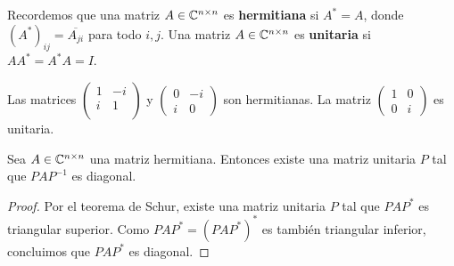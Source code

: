 \begin{block}
    Recordemos que una matriz $A\in\mathbb{C}^{n\times n}$ es \textbf{hermitiana} si
    $A^*=A$, donde $(A^*)_{ij}=\overline{A_{ji}}$ para todo $i,j$. Una matriz
    $A\in\mathbb{C}^{n\times n}$ es \textbf{unitaria} si $AA^*=A^*A=I$. 
\end{block}

\begin{example}
	Las matrices
	$
	\begin{pmatrix}
		1 & -i\\
		i & 1\\
	\end{pmatrix}
	$
	y 
	$
	\begin{pmatrix}
		0 & -i\\
		i & 0
	\end{pmatrix}
	$
	son hermitianas. 
	La matriz $\begin{pmatrix} 1 & 0\\ 0 & i\end{pmatrix}$ 
	es unitaria. 
\end{example}


\begin{cor}
    \label{cor:Schur}
	Sea $A\in\mathbb{C}^{n\times n}$ una matriz hermitiana. Entonces existe una matriz
	unitaria $P$ tal que $PAP^{-1}$ es diagonal. 

	\begin{proof}
		Por el teorema de Schur, existe una matriz unitaria $P$ tal que $PAP^*$
		es triangular superior. Como $PAP^*=(PAP^*)^*$ es también
		triangular inferior, concluimos que $PAP^*$ es diagonal.
	\end{proof}
\end{cor}

%
%

